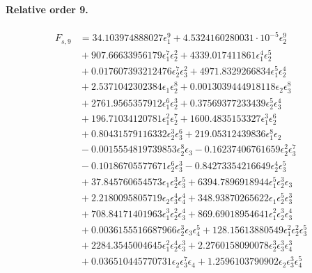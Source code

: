 \documentclass[10pt]{article}
\begin{document}
\paragraph{Relative order 9.}
\begin{align*}
F_{s,9} &= 34.103974888027 \epsilon_{1}^{9} + 4.5324160280031 \cdot 10^{-5} \epsilon_{2}^{9} \\
&{}  + 907.66633956179 \epsilon_{1}^{7} \epsilon_{2}^{2} + 4339.017411861 \epsilon_{1}^{4} \epsilon_{2}^{5} \\
&{}  + 0.017607393212476 \epsilon_{2}^{7} \epsilon_{3}^{2} + 4971.8329266834 \epsilon_{1}^{5} \epsilon_{2}^{4} \\
&{}  + 2.5371042302384 \epsilon_{1} \epsilon_{2}^{8} + 0.0013039444918118 \epsilon_{2} \epsilon_{3}^{8} \\
&{}  + 2761.9565357912 \epsilon_{1}^{6} \epsilon_{2}^{3} + 0.37569377233439 \epsilon_{2}^{5} \epsilon_{3}^{4} \\
&{}  + 196.71034120781 \epsilon_{1}^{2} \epsilon_{2}^{7} + 1600.4835153327 \epsilon_{1}^{3} \epsilon_{2}^{6} \\
&{}  + 0.80431579116332 \epsilon_{2}^{3} \epsilon_{3}^{6} + 219.05312439836 \epsilon_{1}^{8} \epsilon_{2} \\
&{}  - 0.0015554819739853 \epsilon_{2}^{8} \epsilon_{3} - 0.16237406761659 \epsilon_{2}^{2} \epsilon_{3}^{7} \\
&{}  - 0.10186705577671 \epsilon_{2}^{6} \epsilon_{3}^{3} - 0.84273354216649 \epsilon_{2}^{4} \epsilon_{3}^{5} \\
&{}  + 37.845760654573 \epsilon_{1} \epsilon_{2}^{3} \epsilon_{3}^{5} + 6394.7896918944 \epsilon_{1}^{5} \epsilon_{2}^{3} \epsilon_{3} \\
&{}  + 2.2180095805719 \epsilon_{2} \epsilon_{3}^{4} \epsilon_{4}^{4} + 348.93870265622 \epsilon_{1} \epsilon_{2}^{5} \epsilon_{3}^{3} \\
&{}  + 708.84171401963 \epsilon_{1}^{3} \epsilon_{2}^{2} \epsilon_{3}^{4} + 869.69018954641 \epsilon_{1}^{2} \epsilon_{2}^{3} \epsilon_{3}^{4} \\
&{}  + 0.0036155516687966 \epsilon_{2}^{3} \epsilon_{3} \epsilon_{4}^{5} + 128.15613880549 \epsilon_{1}^{2} \epsilon_{2}^{2} \epsilon_{3}^{5} \\
&{}  + 2284.3545004645 \epsilon_{1}^{2} \epsilon_{2}^{4} \epsilon_{3}^{3} + 2.2760158090078 \epsilon_{2}^{3} \epsilon_{3}^{3} \epsilon_{4}^{3} \\
&{}  + 0.036510445770731 \epsilon_{2} \epsilon_{3}^{7} \epsilon_{4} + 1.2596103790902 \epsilon_{2} \epsilon_{3}^{3} \epsilon_{4}^{5} \\

\end{align*}
\end{document}
